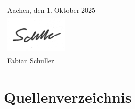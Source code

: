 \documentclass{article}
\theoremstyle{mystyle}
\begin{document}
\noindent

\thispagestyle{empty}

\begin{tabularx}{\textwidth}{@{}lX@{}}
Aachen, den 1. Oktober 2025 
& 
\begin{flushright}

  \rule{6cm}{0.4pt} \\[-1.5cm] %
  \includegraphics[height=1.8cm]{images/unterschrift.png} \\
  Fabian Schuller
\end{flushright}

\end{tabularx}

\newpage

\tableofcontents
\newpage



















\section{Quellenverzeichnis}

\printbibliography
\end{document}
